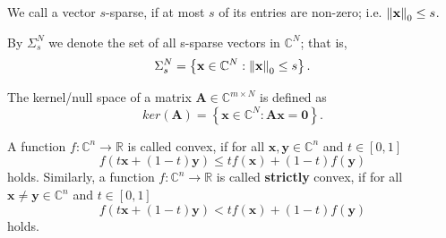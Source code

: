 \begin{tight_equations}

\begin{definition}[sparsity]
We call a vector $s$-sparse, if at most $s$ of its entries are non-zero; i.e. $\left\lVert\mathbf{x}\right\rVert_0 \le s$.
\end{definition}

\begin{notation}
By $\Sigma_s^N$ we denote the set of all s-sparse vectors in $\mathbb{C}^N$; that is,
\[\Sigma_s^N = \left\{\mathbf{x} \in \mathbb{C}^N : \left\lVert\mathbf{x}\right\rVert_0 \le s \right\}.\]
\end{notation}



\begin{definition}
The kernel/null space of a matrix $\mathbf{A} \in \mathbb{C}^{m \times N}$ is defined as
\[ker(\mathbf{A}) = \left\{\mathbf{x} \in \mathbb{C}^N : \mathbf{Ax} = \mathbf{0}\right\}.\]
\end{definition}

\begin{definition}
A function $f:\mathbb{C}^n \rightarrow \mathbb{R}$ is called convex, if for all $\mathbf{x}, \mathbf{y} \in \mathbb{C}^n $ and $t\in [0,1]$
\[f(t\mathbf{x} + (1-t)\mathbf{y}) \le t f(\mathbf{x}) + (1-t) f(\mathbf{y})\]
holds. Similarly, a function $f:\mathbb{C}^n  \rightarrow \mathbb{R}$ is called \textbf{strictly} convex, if for all $\mathbf{x} \ne \mathbf{y} \in \mathbb{C}^n $ and $t\in [0,1]$
\[f(t\mathbf{x} + (1-t)\mathbf{y}) < t f(\mathbf{x}) + (1-t) f(\mathbf{y})\]
holds.
\end{definition}


\end{tight_equations}
